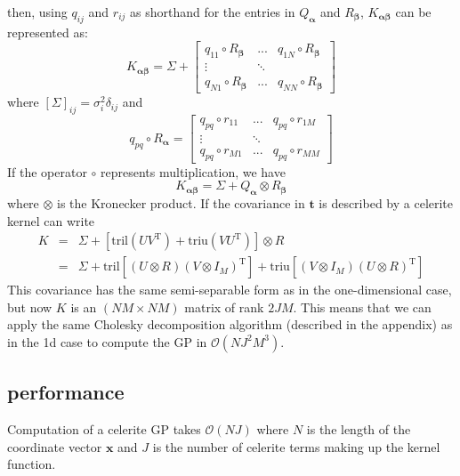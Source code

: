 \documentclass[modern]{aastex62}
\newcommand{\project}[1]{\textsf{#1}}
\newcommand{\celerite}{\project{celerite }}
\newcommand{\bvec}[1]{{\ensuremath{\boldsymbol{#1}}}}
\newcommand{\T}{\ensuremath{\mathrm{T}}}
\begin{document}
	then, using $q_{ij}$ and $r_{ij}$ as shorthand for the entries in $Q_\bvec{\alpha}$ and $R_\bvec{\beta}$, $K_\bvec{\alpha\beta}$ can be represented as: 
	\begin{equation}
		K_\bvec{\alpha\beta} = \Sigma + 
			\begin{bmatrix}
				q_{11}\circ R_\bvec{\beta} & ... & q_{1N}\circ R_\bvec{\beta} \\
				\vdots & \ddots & \\
				q_{N1}\circ R_\bvec{\beta} & ... & q_{NN}\circ R_\bvec{\beta}
			\end{bmatrix}
	\end{equation}
	where $[\Sigma]_{ij} = \sigma_i^2\delta_{ij}$ and
	\begin{equation}
		q_{pq}\circ R_\bvec{\alpha} = 
			\begin{bmatrix}
				q_{pq}\circ r_{11} & ... & q_{pq}\circ r_{1M} \\
				\vdots & \ddots & \\
				q_{pq}\circ r_{M1} & ... & q_{pq}\circ r_{MM}
			\end{bmatrix}
	\end{equation}
	If the operator $\circ$ represents multiplication, we have 
	\begin{equation}
		K_\bvec{\alpha\beta} = \Sigma + Q_\bvec{\alpha} \otimes  R_\bvec{\beta}
	\end{equation}
	where $\otimes$ is the Kronecker product. If the covariance in $\bvec{t}$ is described by a \celerite kernel can write 
	\begin{eqnarray}
		K &=& \Sigma + \left[\mathrm{tril}(UV^\T) + \mathrm{triu}(VU^\T)\right]\otimes R \\
		&=& \Sigma + \mathrm{tril}\left[ (U\otimes R)(V\otimes I_M)^\T\right] + \mathrm{triu}\left[ (V\otimes I_M)(U\otimes R)^\T\right]
	\end{eqnarray}
	This covariance has the same semi-separable form as in the one-dimensional case, but now $K$ is an $(NM\times NM)$ matrix of rank $2JM$. 
	This means that we can apply the same Cholesky decomposition algorithm (described in the appendix) as in the 1d case to compute the GP in 
	$\mathcal{O}(NJ^2M^3)$. 

	\subsection{performance}
	Computation of a \celerite GP takes $\mathcal{O}(NJ)$ where $N$ is the length of the coordinate vector $\bvec{x}$ and $J$ is the number of 
	\celerite terms making up the kernel function. 
	
\end{document}
